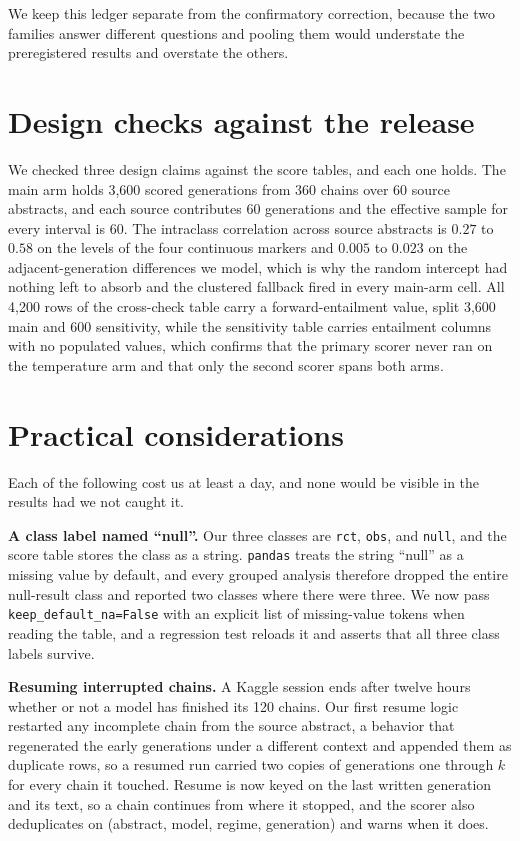 \documentclass{article}
\begin{document}
We keep this ledger separate from the confirmatory correction, because the two families answer different questions and pooling them would understate the preregistered results and overstate the others.

\section{Design checks against the release}
\label{app:design}

We checked three design claims against the score tables, and each one holds. The main arm holds 3{,}600 scored generations from 360 chains over 60 source abstracts, and each source contributes 60 generations and the effective sample for every interval is 60. The intraclass correlation across source abstracts is $0.27$ to $0.58$ on the levels of the four continuous markers and $0.005$ to $0.023$ on the adjacent-generation differences we model, which is why the random intercept had nothing left to absorb and the clustered fallback fired in every main-arm cell. All 4{,}200 rows of the cross-check table carry a forward-entailment value, split 3{,}600 main and 600 sensitivity, while the sensitivity table carries entailment columns with no populated values, which confirms that the primary scorer never ran on the temperature arm and that only the second scorer spans both arms.

\section{Practical considerations}
\label{app:practical}

Each of the following cost us at least a day, and none would be visible in the results had we not caught it.

\textbf{A class label named ``null''.} Our three classes are \texttt{rct}, \texttt{obs}, and \texttt{null}, and the score table stores the class as a string. \texttt{pandas} treats the string ``null'' as a missing value by default, and every grouped analysis therefore dropped the entire null-result class and reported two classes where there were three. We now pass \texttt{keep\_default\_na=False} with an explicit list of missing-value tokens when reading the table, and a regression test reloads it and asserts that all three class labels survive.

\textbf{Resuming interrupted chains.} A Kaggle session ends after twelve hours whether or not a model has finished its 120 chains. Our first resume logic restarted any incomplete chain from the source abstract, a behavior that regenerated the early generations under a different context and appended them as duplicate rows, so a resumed run carried two copies of generations one through $k$ for every chain it touched. Resume is now keyed on the last written generation and its text, so a chain continues from where it stopped, and the scorer also deduplicates on (abstract, model, regime, generation) and warns when it does.
\end{document}

